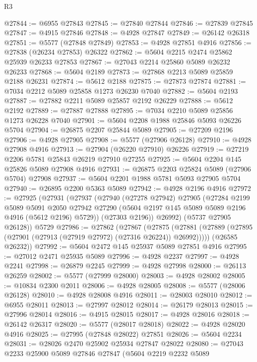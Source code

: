 \begin{lexlean}{R3}
\begin{coremodule}
@27844 := @6955 @27843
@27845 := @27840 @27844
@27846 := @27839 @27845
@27847 := @4915 @27846
@27848 := @4928 @27847
@27849 := @26142 @26318
@27851 := @5577 (@27848 @27849)
@27853 := @4928 @27851 @4916
@27856 := @27838 (@26234 @27853) @26322
@27862 := @5604 @2215 @2474 @25862 @25939 @26233 @27853
@27867 := @27043 @2214 @25860 @5089 @26232 @26233
@27868 := @5604 @2189
@27873 := @27868 @2213 @5089 @25859 @2188 @26231
@27874 := @5612 @2188
@27875 := @27873 @27874
@27881 := @7034 @2212 @5089 @25858 @1273 @26230 @7040
@27882 := @5604 @2193
@27887 := @27882 @2211 @5089 @25857 @2192 @26229
@27888 := @5612 @2192
@27889 := @27887 @27888
@27895 := @7034 @2210 @5089 @25856 @1273 @26228 @7040
@27901 := @5604 @2208 @1988 @25846 @5093 @26226 @5704
@27904 := @26875 @2207 @25844 @5089
@27905 := @27209 @2196
@27906 := @4928 @27905
@27908 := @5577 (@27906 @26128)
@27910 := @4928 @27908 @4916
@27913 := @27904 (@26220 @27910) @26226
@27919 := @27219 @2206 @5781 @25843 @26219 @27910 @27255
@27925 := @5604 @2204 @145 @25826 @5089 @27908 @4916
@27931 := @26875 @2203 @25824 @5089 (@27906 @5704) @27908
@27937 := @5604 @2201 @1988 @5781 @5093 @27905 @5704
@27940 := @26895 @2200 @5363 @5089
@27942 := @4928 @2196 @4916
@27972 := @27925
    (@27931
      (@27937
        (@27940
          (@27278 @27942)
          @27905
          (@27284
            @2199
            @5089
            @5091
            @2050
            @27942
            @27290
            (@5604 @2197 @145 @5089 @5089 @2196 @4916 (@5612 @2196) @5729))
          (@27303 @2196))
        @26992)
      (@5737 @27905 @26128))
    @5729
@27986 := @27862
    (@27867
      (@27875 (@27881 (@27889 (@27895 (@27901 (@27913 (@27919 @27972) (@27316 @26224)) @26992)))))
      (@26585 @26232))
@27992 := @5604 @2472 @145 @25937 @5089 @27851 @4916
@27995 := @27012 @2471 @25935 @5089
@27996 := @4928 @2237
@27997 := @4928 @2241
@27998 := @26879 @2245
@27999 := @4928 @27998
@28000 := @26113 @26259
@28002 := @5577 (@27999 @28000)
@28003 := @4928 @28002
@28005 := @10834 @2300 @2011
@28006 := @4928 @28005
@28008 := @5577 (@28006 @26128)
@28010 := @4928 @28008 @4916
@28011 := @28003 @28010
@28012 := @6955 @28011
@28013 := @27997 @28012
@28014 := @26179 @28013
@28015 := @27996 @28014
@28016 := @4915 @28015
@28017 := @4928 @28016
@28018 := @26142 @26317
@28020 := @5577 (@28017 @28018)
@28022 := @4928 @28020 @4916
@28025 := @27995 (@27848 @28022) @27851
@28026 := @5604 @2234
@28031 := @28026 @2470 @25902 @25934 @27847 @28022
@28080 := @27043
    @2233
    @25900
    @5089
    @27846
    @27847
    (@5604
      @2219
      @2232
      @5089

\end{coremodule}
\end{lexlean}
